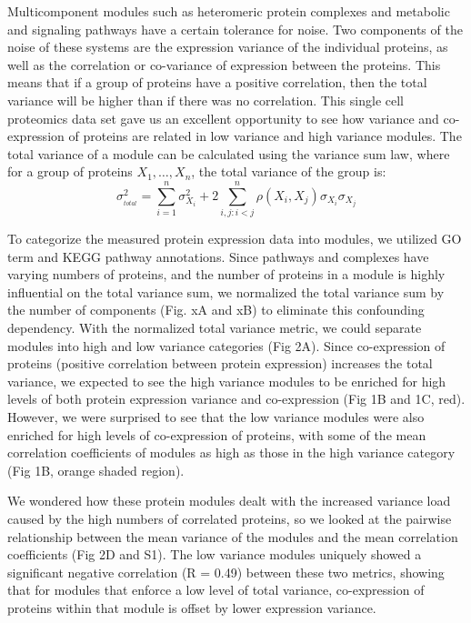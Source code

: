 \documentclass[11pt,]{article}
\begin{document}
Multicomponent modules such as heteromeric protein complexes and
metabolic and signaling pathways have a certain tolerance for noise. Two
components of the noise of these systems are the expression variance of
the individual proteins, as well as the correlation or co-variance of
expression between the proteins. This means that if a group of proteins
have a positive correlation, then the total variance will be higher than
if there was no correlation. This single cell proteomics data set gave
us an excellent opportunity to see how variance and co-expression of
proteins are related in low variance and high variance modules. The
total variance of a module can be calculated using the variance sum law,
where for a group of proteins \(X_{1},\dotsc,X_{n}\), the total variance
of the group is:
\[\sigma_{{}_{total}}^2 = \sum_{i=1}^{n} \sigma_{X_{i}}^2 + 2\sum_{i,j:i<j}^{n} \rho(X_{i},X_{j})\sigma_{X_i}\sigma_{X_j}\]

To categorize the measured protein expression data into modules, we
utilized GO term and KEGG pathway annotations. Since pathways and
complexes have varying numbers of proteins, and the number of proteins
in a module is highly influential on the total variance sum, we
normalized the total variance sum by the number of components (Fig. xA
and xB) to eliminate this confounding dependency. With the normalized
total variance metric, we could separate modules into high and low
variance categories (Fig 2A). Since co-expression of proteins (positive
correlation between protein expression) increases the total variance, we
expected to see the high variance modules to be enriched for high levels
of both protein expression variance and co-expression (Fig 1B and 1C,
red). However, we were surprised to see that the low variance modules
were also enriched for high levels of co-expression of proteins, with
some of the mean correlation coefficients of modules as high as those in
the high variance category (Fig 1B, orange shaded region).

We wondered how these protein modules dealt with the increased variance
load caused by the high numbers of correlated proteins, so we looked at
the pairwise relationship between the mean variance of the modules and
the mean correlation coefficients (Fig 2D and S1). The low variance
modules uniquely showed a significant negative correlation (R = 0.49)
between these two metrics, showing that for modules that enforce a low
level of total variance, co-expression of proteins within that module is
offset by lower expression variance.
\end{document}
